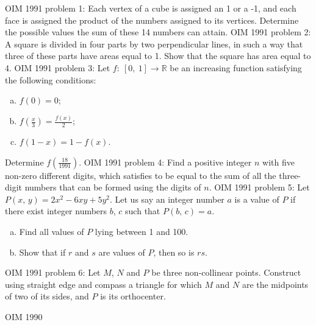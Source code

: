 OIM 1991 problem 1:  Each vertex of a cube is assigned an 1 or a -1, and each face is assigned the product of the numbers assigned to its vertices. Determine the possible values the sum of these 14 numbers can attain. 
OIM 1991 problem 2:  A square is divided in four parts by two perpendicular lines, in such a way that three of these parts have areas equal to 1. Show that the square has area equal to 4. 
OIM 1991 problem 3:  Let $f: \ [0,\ 1] \rightarrow \mathbb{R}$ be an increasing function satisfying the following conditions:
\begin{enumerate}[a)]
  \item $f(0)=0$;
  \item $f\left(\frac{x}{3}\right)=\frac{f(x)}{2}$;
  \item $f(1-x)=1-f(x)$.
\end{enumerate}
Determine $f\left(\frac{18}{1991}\right)$. 
OIM 1991 problem 4:  Find a positive integer $n$ with five non-zero different digits, which satisfies to be equal to the sum of all the three-digit numbers that can be formed using the digits of $n$. 
OIM 1991 problem 5:  Let $P(x,\, y)=2x^2-6xy+5y^2$. Let us say an integer number $a$ is a value of $P$ if there exist integer numbers $b$, $c$ such that $P(b,\, c)=a$.
\begin{enumerate}[a)]
  \item Find all values of $P$ lying between 1 and 100.
  \item Show that if $r$ and $s$ are values of $P$, then so is $rs$.
\end{enumerate} 
OIM 1991 problem 6:  Let $M$, $N$ and $P$ be three non-collinear points. Construct using straight edge and compass a triangle for which $M$ and $N$ are the midpoints of two of its sides, and $P$ is its orthocenter. 

OIM 1990 

